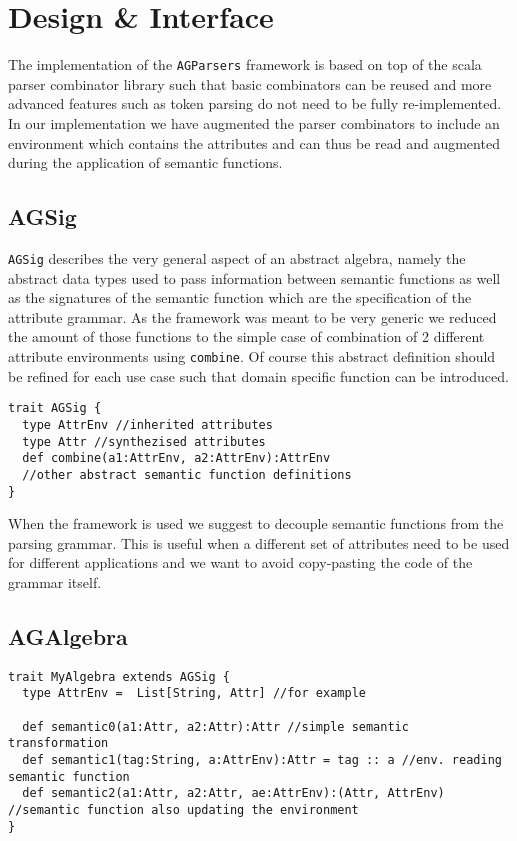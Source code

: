 \section{Design \& Interface}
The implementation of the \verb/AGParsers/ framework is based on top of the scala parser combinator library such that basic combinators can be reused and more advanced features such as token parsing do not need to be fully re-implemented. In our implementation we have augmented the parser combinators to include an environment which contains the attributes and can thus be read and augmented during the application of semantic functions.

\subsection{AGSig}
\verb/AGSig/ describes the very general aspect of an abstract algebra, namely the abstract data types used to pass information between semantic functions as well as the signatures of the semantic function which are the specification of the attribute grammar. As the framework was meant to be very generic we reduced the amount of those functions to the simple case of combination of 2 different attribute environments using \verb/combine/. Of course this abstract definition should be refined for each use case such that domain specific function can be introduced.
\begin{lstlisting}
trait AGSig {
  type AttrEnv //inherited attributes
  type Attr //synthezised attributes
  def combine(a1:AttrEnv, a2:AttrEnv):AttrEnv
  //other abstract semantic function definitions
}
\end{lstlisting}

When the framework is used we suggest to decouple semantic functions from the parsing grammar. This is useful when a different set of attributes need to be used for different applications and we want to avoid copy-pasting the code of the grammar itself. 

\subsection{AGAlgebra}
\begin{lstlisting}
trait MyAlgebra extends AGSig {
  type AttrEnv =  List[String, Attr] //for example

  def semantic0(a1:Attr, a2:Attr):Attr //simple semantic transformation
  def semantic1(tag:String, a:AttrEnv):Attr = tag :: a //env. reading semantic function
  def semantic2(a1:Attr, a2:Attr, ae:AttrEnv):(Attr, AttrEnv) //semantic function also updating the environment
}
\end{lstlisting}

